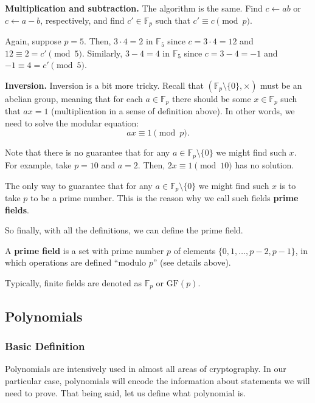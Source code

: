 \documentclass[../lecture-notes.tex]{subfiles}
\begin{document}
\textbf{Multiplication and subtraction.} The algorithm is the same. Find $c \gets ab$ or $c \gets a-b$, respectively, and find $c' \in \mathbb{F}_p$ such that $c' \equiv c \pmod{p}$.

\begin{example}
    Again, suppose $p=5$. Then, $3 \cdot 4 = 2$ in $\mathbb{F}_5$ since $c=3 \cdot 4 = 12$ and $12 \equiv 2 = c' \pmod{5}$. Similarly, $3-4 = 4$ in $\mathbb{F}_5$ since $c=3-4=-1$ and $-1 \equiv 4 = c' \pmod{5}$.
\end{example}

\textbf{Inversion.} Inversion is a bit more tricky. Recall that $(\mathbb{F}_p \setminus \{0\}, \times)$ must be an abelian group, meaning that for each $a \in \mathbb{F}_p$ there should be some $x \in \mathbb{F}_p$ such that $ax = 1$ (multiplication in a sense of definition above). In other words, we need to solve the modular equation:
\begin{equation}
    ax \equiv 1 \pmod{p}.
\end{equation}

Note that there is no guarantee that for any $a \in \mathbb{F}_p \setminus \{0\}$ we might find such $x$. For example, take $p=10$ and $a=2$. Then, $2x \equiv 1 \pmod{10}$ has no solution. 

The only way to guarantee that for any $a \in \mathbb{F}_p \setminus \{0\}$ we might find such $x$ is to take $p$ to be a prime number. This is the reason why we call such fields \textbf{prime fields}.

So finally, with all the definitions, we can define the prime field.

\begin{definition}
    A \textbf{prime field} is a set with prime number $p$ of elements $\{0,1,\dots,p-2,p-1\}$, in which operations are defined ``modulo $p$'' (see details above). 

    Typically, finite fields are denoted as $\mathbb{F}_p$ or $\text{GF}(p)$.
\end{definition}


\subsection{Polynomials}

\subsubsection{Basic Definition}

Polynomials are intensively used in almost all areas of cryptography. In our particular case, polynomials will encode the information about
statements we will need to prove. That being said, let us define what polynomial is.
\end{document}
